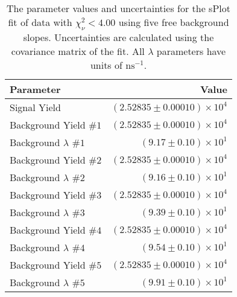 
\begin{table}[h]
    \begin{center}
        \begin{tabular}{lr}\toprule
            Parameter & Value \\\midrule
            Signal Yield & $(2.52835 \pm 0.00010) \times 10^{4}$ \\
            Background Yield $\#1$ & $(2.52835 \pm 0.00010) \times 10^{4}$ \\
            Background $\lambda$ $\#1$ & $(9.17 \pm 0.10) \times 10^{1}$ \\
            Background Yield $\#2$ & $(2.52835 \pm 0.00010) \times 10^{4}$ \\
            Background $\lambda$ $\#2$ & $(9.16 \pm 0.10) \times 10^{1}$ \\
            Background Yield $\#3$ & $(2.52835 \pm 0.00010) \times 10^{4}$ \\
            Background $\lambda$ $\#3$ & $(9.39 \pm 0.10) \times 10^{1}$ \\
            Background Yield $\#4$ & $(2.52835 \pm 0.00010) \times 10^{4}$ \\
            Background $\lambda$ $\#4$ & $(9.54 \pm 0.10) \times 10^{1}$ \\
            Background Yield $\#5$ & $(2.52835 \pm 0.00010) \times 10^{4}$ \\
            Background $\lambda$ $\#5$ & $(9.91 \pm 0.10) \times 10^{1}$ \\\bottomrule
        \end{tabular}
        \caption{The parameter values and uncertainties for the sPlot fit of data with $\chi^2_\nu < 4.00$ using five free background slopes. Uncertainties are calculated using the covariance matrix of the fit. All $\lambda$ parameters have units of $\si{\nano\second}^{-1}$.}
    \end{center}
\end{table}
